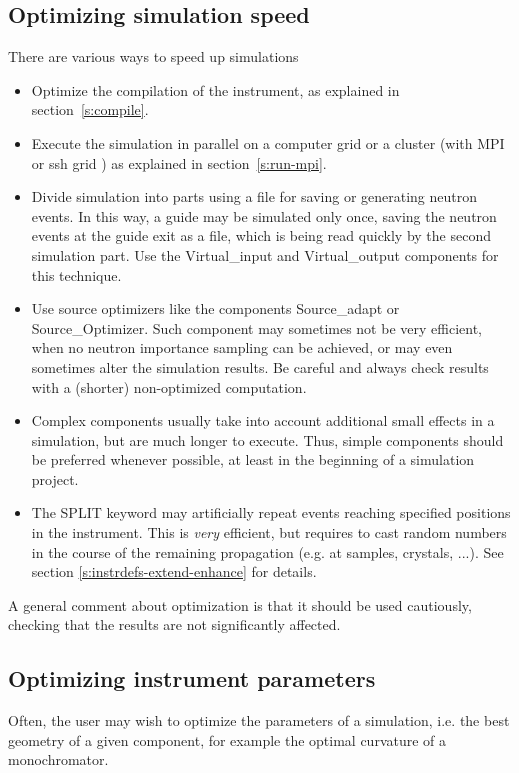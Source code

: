 \subsection{Optimizing simulation speed}
\label{s:optim}
There are various ways to speed up simulations
\begin{itemize}
\item Optimize the compilation of the instrument, as explained in
  section~\ref{s:compile}.
\item Execute the simulation in parallel on a computer grid or a cluster (with
  MPI or ssh grid ) as explained in section~\ref{s:run-mpi}.
\item Divide simulation into parts using a file for saving or generating neutron
  events. In this way, a guide may be simulated only once, saving the neutron
  events at the guide exit as a file, which is being read quickly by the second
  simulation part. Use the Virtual\_input and Virtual\_output components for
  this technique.
\item Use source optimizers like the components Source\_adapt or
  Source\_Optimizer. Such component may sometimes not be very efficient, when no
  neutron importance sampling can be achieved, or may even sometimes alter the
  simulation results. Be careful and always check results with a (shorter)
  non-optimized computation.
\item Complex components usually take into account additional small effects in a
  simulation, but are much longer to execute. Thus, simple components should be
  preferred whenever possible, at least in the beginning of a simulation project.
\item The SPLIT keyword may artificially repeat events reaching specified
  positions in the instrument. This is \emph{very} efficient, but requires to
  cast random numbers in the course of the remaining propagation (e.g. at
  samples, crystals, ...). See section \ref{s:instrdefs-extend-enhance} for
  details.
\end{itemize}
A general comment about optimization is that it should be used cautiously,
checking that the results are not significantly affected.

\subsection{Optimizing instrument parameters}
\label{s:optimize}
Often, the user may wish to optimize the parameters of a simulation, i.e. the
best geometry of a given component, for example the optimal curvature of a
monochromator.

